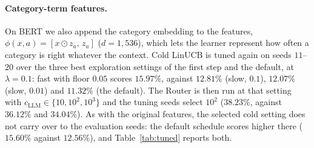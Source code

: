 \documentclass[anon]{alt2027} %
\begin{document}
\paragraph{Category-term features.} On BERT we also append the category
embedding to the features, $\phi(x,a)=[x\odot z_a,\,z_a]$ ($d=1{,}536$), which
lets the learner represent how often a category is right whatever the
context. Cold LinUCB is tuned again on seeds $11$--$20$ over the three best
exploration settings of the first step and the default, at $\lambda=0.1$: fast
with floor $0.05$ scores $15.97\%$, against $12.81\%$ (slow, $0.1$), $12.07\%$
(slow, $0.01$) and $11.32\%$ (the default). The Router is then run at that
setting with $c_{\mathrm{LLM}}\in\{10,10^2,10^3\}$ and the tuning seeds select $10^2$
($38.23\%$, against $36.12\%$ and $34.04\%$). As with the original features,
the selected cold setting does not carry over to the evaluation seeds: the
default schedule scores higher there ($15.60\%$ against $12.56\%$), and
Table~\ref{tab:tuned} reports both.
\end{document}
